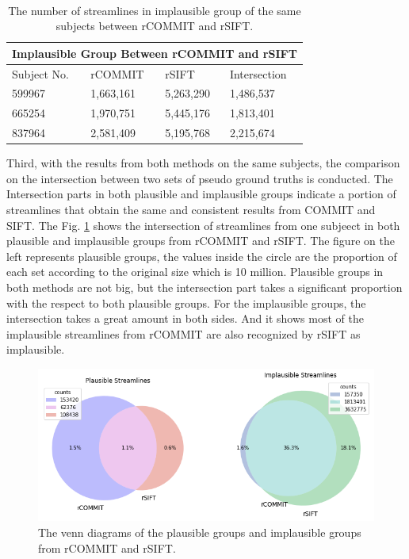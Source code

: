 \begin{table}[!ht]
    \centering
    \caption{The number of streamlines in implausible group of the same subjects between rCOMMIT and rSIFT.}
    ~\\
    \label{table:implaus}
    \begin{tabular}{p{3cm}|p{3cm}|p{3cm}|p{3cm}}
    \toprule
    \multicolumn{4}{c}{\textbf{Implausible Group Between rCOMMIT and rSIFT}} \\
    \toprule
    Subject No. & rCOMMIT & rSIFT & Intersection \\
    \hline
    599967 & 1,663,161 &5,263,290 & 1,486,537 \\
    \hline
    665254 & 1,970,751 &5,445,176 & 1,813,401 \\
    \hline
    837964 & 2,581,409 &5,195,768 & 2,215,674 \\
    \bottomrule
    \end{tabular}
\end{table}

Third, with the results from both methods on the same subjects, the comparison on the intersection between two sets of pseudo ground truths
is conducted. The Intersection parts in both plausible and implausible groups indicate a portion of streamlines that obtain the 
same and consistent results from COMMIT and SIFT. The Fig. \ref*{fig:com_s_c} shows the intersection of streamlines from one subjeect in both plausible 
and implausible groups from rCOMMIT and rSIFT. 
The figure on the left represents plausible groups, the values inside the circle are the proportion of each set
according to the original size which is 10 million. Plausible groups in both methods are not big, but the intersection part
takes a significant proportion with the respect to both plausible groups. For the implausible groups, the intersection takes a great amount in both sides. 
And it shows most of the implausible streamlines from rCOMMIT are also recognized by rSIFT as implausible.


\begin{figure}[ht]
    \centering
    \includegraphics[width= 12cm]{figures/comp_s_c.png}
        \caption{The venn diagrams of the plausible groups and implausible groups from rCOMMIT and rSIFT.}
    \label{fig:com_s_c}
\end{figure}

